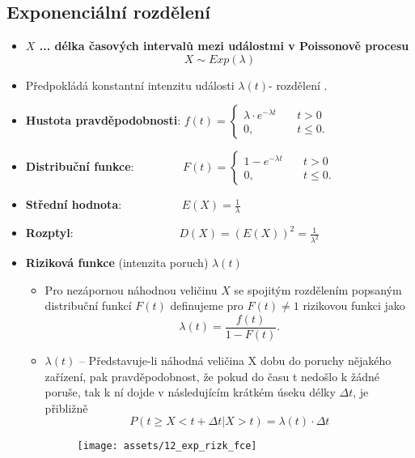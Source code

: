 \subsection{Exponenciální rozdělení}
\begin{itemize}
    \item \textbf{$X$ ... délka časových intervalů mezi událostmi v Poissonově procesu}
          $$X \sim Exp(\lambda)$$
    \item Předpokládá konstantní intenzitu události $\lambda(t)$- rozdělení .
    \item \textbf{Hustota pravděpodobnosti}:
          $f(t) =  \begin{cases}
                  \lambda \cdot e^{-\lambda t} & \quad t > 0     \\
                  0,                           & \quad t \leq 0.
              \end{cases}$
    \item \textbf{Distribuční funkce}:
          $\qquad\qquad F(t) =  \begin{cases}
                  1 -  e^{-\lambda t} & \quad t > 0     \\
                  0,                  & \quad t \leq 0.
              \end{cases}$
    \item \textbf{Střední hodnota}: $\qquad\qquad\quad E(X) = \frac{1}{\lambda}$
    \item \textbf{Rozptyl}: $\qquad\qquad\qquad\qquad\quad D(X) = (E(X))^2 = \frac{1}{\lambda^2}$ \\
    \item \textbf{Riziková funkce} (intenzita poruch) $\lambda (t)$
          \begin{itemize}
              \item Pro nezápornou náhodnou veličinu $X$ se spojitým rozdělením popsaným distribuční funkcí $F(t)$ definujeme pro $F(t) \not= 1$ rizikovou funkci jako  $$\lambda(t) = \frac{f(t)}{1 - F(t)}.$$
              \item $\lambda(t)$ -- Představuje-li náhodná veličina X dobu do poruchy nějakého zařízení, pak pravděpodobnost, že pokud do času t nedošlo k žádné poruše, tak k ní dojde v následujícím krátkém úseku délky $\Delta t$, je přibližně
                    $$P(t \geq X <t + \Delta t|X > t) = \lambda(t) \cdot \Delta t$$
                    \begin{figure}[H]
                        \centering
                        \texttt{[image: assets/12\_exp\_rizk\_fce]}

\end{figure}
\end{itemize}
\end{itemize}
